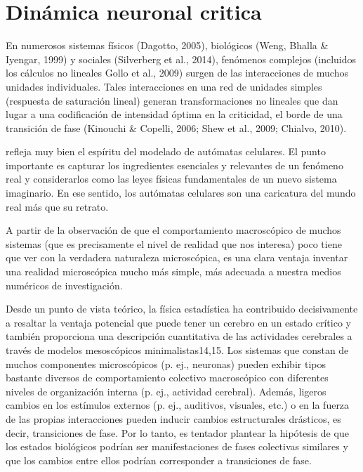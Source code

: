 \chapter{Dinámica neuronal critica}\label{titulo-cap-critico}
\graphicspath{{figs/capitulo_critico/}}

 
 En numerosos sistemas físicos (Dagotto, 2005), biológicos (Weng, Bhalla \& Iyengar, 1999) y sociales (Silverberg et al., 2014), fenómenos complejos (incluidos los cálculos no lineales Gollo et al., 2009) surgen de las interacciones de muchos unidades individuales. Tales interacciones en una red de unidades simples (respuesta de saturación lineal) generan transformaciones no lineales que dan lugar a una codificación de intensidad óptima en la criticidad, el borde de una transición de fase (Kinouchi \& Copelli, 2006; Shew et al., 2009; Chialvo, 2010).
 
 refleja muy bien el espíritu del modelado de autómatas celulares. El punto importante es capturar los ingredientes esenciales y relevantes de un fenómeno real y considerarlos como las leyes físicas fundamentales de un nuevo sistema imaginario. En ese sentido, los autómatas celulares son una caricatura del mundo real más que su retrato.
 
 A partir de la observación de que el comportamiento macroscópico de muchos sistemas (que es precisamente el nivel de realidad que nos interesa) poco tiene que ver con la verdadera naturaleza microscópica, es una clara ventaja inventar una realidad microscópica mucho más simple, más adecuada a nuestra medios numéricos de investigación. 
 
 
 Desde un punto de vista teórico, la física estadística ha contribuido decisivamente a resaltar la ventaja potencial que puede tener un cerebro en un estado crítico y también proporciona una descripción cuantitativa de las actividades cerebrales a través de modelos mesoscópicos minimalistas14,15. Los sistemas que constan de muchos componentes microscópicos (p. ej., neuronas) pueden exhibir tipos bastante diversos de comportamiento colectivo macroscópico con diferentes niveles de organización interna (p. ej., actividad cerebral). Además, ligeros cambios en los estímulos externos (p. ej., auditivos, visuales, etc.) o en la fuerza de las propias interacciones pueden inducir cambios estructurales drásticos, es decir, transiciones de fase. Por lo tanto, es tentador plantear la hipótesis de que los estados biológicos podrían ser manifestaciones de fases colectivas similares y que los cambios entre ellos podrían corresponder a transiciones de fase.
 
